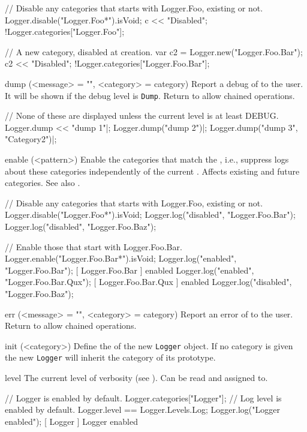 \begin{urbiscriptapi}
\begin{urbiassert}
// Disable any categories that starts with Logger.Foo, existing or not.
Logger.disable("Logger.Foo*").isVoid;
c << "Disabled";
!Logger.categories["Logger.Foo"];

// A new category, disabled at creation.
var c2 = Logger.new("Logger.Foo.Bar");
c2 << "Disabled";
!Logger.categories["Logger.Foo.Bar"];
\end{urbiassert}

\item[dump](<message> = "", <category> = category)%
  Report a debug  of  to the user. It will be
  shown if the debug level is \lstinline|Dump|. Return \this to allow
  chained operations.
\begin{urbiscript}
// None of these are displayed unless the current level is at least DEBUG.
Logger.dump << "dump 1"|;
Logger.dump("dump 2")|;
Logger.dump("dump 3", "Category2")|;
\end{urbiscript}

\item[enable](<pattern>)%
  Enable the categories that match the , i.e., suppress logs
  about these categories independently of the current .
  Affects existing and future categories.  See also .
\begin{urbiassert}
// Disable any categories that starts with Logger.Foo, existing or not.
Logger.disable("Logger.Foo*").isVoid;
Logger.log("disabled", "Logger.Foo.Bar");
Logger.log("disabled", "Logger.Foo.Baz");

// Enable those that start with Logger.Foo.Bar.
Logger.enable("Logger.Foo.Bar*").isVoid;
Logger.log("enabled", "Logger.Foo.Bar");
[    Logger.Foo.Bar     ] enabled
Logger.log("enabled", "Logger.Foo.Bar.Qux");
[  Logger.Foo.Bar.Qux   ] enabled
Logger.log("disabled", "Logger.Foo.Baz");
\end{urbiassert}

\item[err](<message> = "", <category> = category)%
  Report an error  of  to the user. Return \this
  to allow chained operations.

\item[init](<category>)%
  Define the  of the new \lstinline|Logger| object. If no
  category is given the new \lstinline|Logger| will inherit the category of
  its prototype.

\item[level]%
  The current level of verbosity (see ).  Can be read and
  assigned to.
\begin{urbiassert}
// Logger is enabled by default.
Logger.categories["Logger"];
// Log level is enabled by default.
Logger.level == Logger.Levels.Log;
Logger.log("Logger enabled");
[        Logger         ] Logger enabled


\end{urbiassert}
\end{urbiscriptapi}
